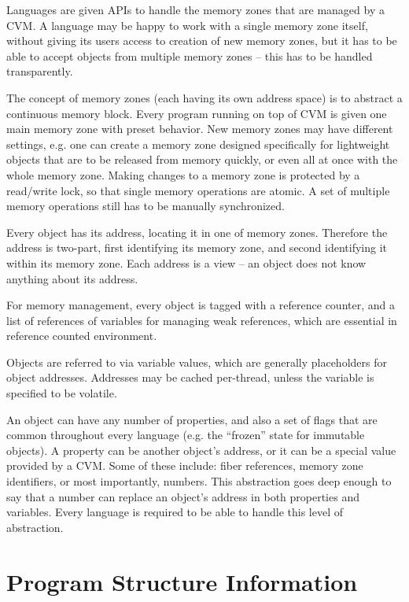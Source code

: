 Languages are given APIs to handle the memory zones that are managed by a CVM. A language may be happy to work with a single memory zone itself, without giving its users access to creation of new memory zones, but it has to be able to accept objects from multiple memory zones -- this has to be handled transparently. 

The concept of memory zones (each having its own address space) is to abstract a continuous memory block. Every program running on top of CVM is given one main memory zone with preset behavior. New memory zones may have different settings, e.g. one can create a memory zone designed specifically for lightweight objects that are to be released from memory quickly, or even all at once with the whole memory zone. Making changes to a memory zone is protected by a read/write lock, so that single memory operations are atomic. A set of multiple memory operations still has to be manually synchronized. 

Every object has its address, locating it in one of memory zones. Therefore the address is two-part, first identifying its memory zone, and second identifying it within its memory zone. Each address is a view -- an object does not know anything about its address. 

For memory management, every object is tagged with a reference counter, and a list of references of variables for managing weak references, which are essential in reference counted environment. 

Objects are referred to via variable values, which are generally placeholders for object addresses. Addresses may be cached per-thread, unless the variable is specified to be volatile. 

An object can have any number of properties, and also a set of flags that are common throughout every language (e.g. the ``frozen'' state for immutable objects). A property can be another object's address, or it can be a special value provided by a CVM. Some of these include: fiber references, memory zone identifiers, or most importantly, numbers. This abstraction goes deep enough to say that a number can replace an object's address in both properties and variables. Every language is required to be able to handle this level of abstraction. 






\section{Program Structure Information}
\label{sec:psi}

